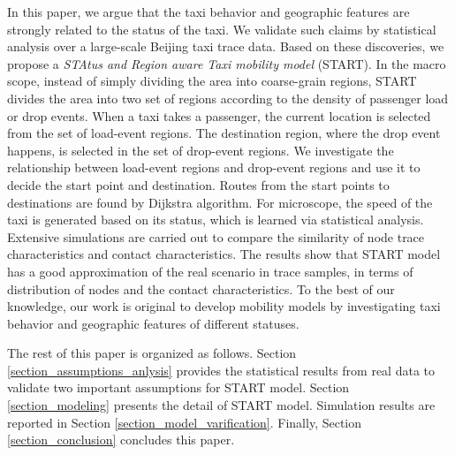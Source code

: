 In this paper, we argue that the taxi behavior and geographic features are strongly related to the status of the taxi. We validate such claims by statistical analysis over a large-scale Beijing taxi trace data. Based on these discoveries, we propose a \emph{STAtus and Region aware Taxi mobility model} (START). In the macro scope, instead of simply dividing the area into coarse-grain regions, START divides the area into two set of regions according to the density of passenger load or drop events.
When a taxi takes a passenger, the current location is selected from the set of load-event regions. The destination region, where the drop event happens, is selected in the set of drop-event regions.
We investigate the relationship between load-event regions and drop-event regions and use it to decide the start point and destination. Routes from the start points to destinations are found by Dijkstra algorithm. For microscope, the speed of the taxi is generated based on its status, which is learned via statistical analysis. Extensive simulations are carried out to compare the similarity of node trace characteristics and contact characteristics. The results show that START model has a good approximation of the real scenario in trace samples, in terms of distribution of nodes and the contact characteristics. To the best of our knowledge, our work is original to develop mobility models by investigating taxi behavior and geographic features of different statuses.

The rest of this paper is organized as follows. Section \ref{section_assumptions_anlysis} provides the statistical results from real data to validate two important assumptions for START model. Section \ref{section_modeling} presents the detail of START model. Simulation results are reported in Section \ref{section_model_varification}. Finally, Section \ref{section_conclusion} concludes this paper.




